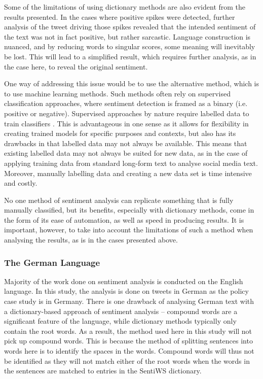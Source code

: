 \documentclass[12pt,onecolumn,twoside]{layout}
\begin{document}
Some of the limitations of using dictionary methods are also evident from the results presented. In the cases where positive spikes were detected, further analysis of the tweet driving those spikes revealed that the intended sentiment of the text was not in fact positive, but rather sarcastic. Language construction is nuanced, and by reducing words to singular scores, some meaning will inevitably be lost. This will lead to a simplified result, which requires further analysis, as in the case here, to reveal the original sentiment. 

One way of addressing this issue would be to use the alternative method, which is to use machine learning methods. Such methods often rely on supervised classification approaches, where sentiment detection is framed as a binary (i.e. positive or negative). Supervised approaches by nature require labelled data to train classifiers \cite{Pang2002}. This is advantageous in one sense as it allows for flexibility in creating trained models for specific purposes and contexts, but also has its drawbacks in that labelled data may not always be available. This means that existing labelled data may not always be suited for new data, as in the case of applying training data from standard long-form text to analyse social media text. Moreover, manually labelling data and creating a new data set is time intensive and costly. 

No one method of sentiment analysis can replicate something that is fully manually classified, but its benefits, especially with dictionary methods, come in the form of its ease of automation, as well as speed in producing results. It is important, however, to take into account the limitations of such a method when analysing the results, as is in the cases presented above. 

\subsubsection*{The German Language} 
Majority of the work done on sentiment analysis is conducted on the English language. In this study, the analysis is done on tweets in German as the policy case study is in Germany. There is one drawback of analysing German text with a dictionary-based approach of sentiment analysis -- compound words are a significant feature of the language, while dictionary methods typically only contain the root words. As a result, the method used here in this study will not pick up compound words. This is because the method of splitting sentences into words here is to identify the spaces in the words. Compound words will thus not be identified as they will not match either of the root words when the words in the sentences are matched to entries in the SentiWS dictionary. 
\end{document}
